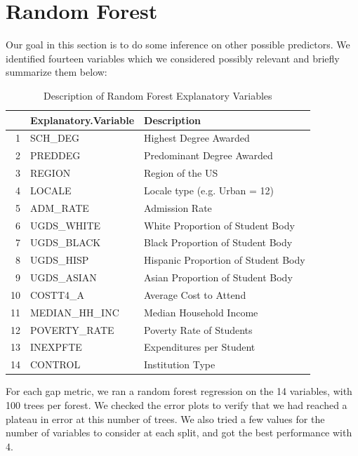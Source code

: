 \documentclass{article}
\begin{document}


\section{Random Forest}

Our goal in this section is to do some inference on other possible predictors. We identified fourteen variables which we considered possibly relevant and briefly summarize them below:
  
  
\begin{table}[ht]
\centering
\caption{Description of Random Forest Explanatory Variables} 
\begin{tabular}{rll}
  \hline
 & Explanatory.Variable & Description \\ 
  \hline
1 & SCH\_DEG & Highest Degree Awarded \\ 
  2 & PREDDEG & Predominant Degree Awarded \\ 
  3 & REGION & Region of the US \\ 
  4 & LOCALE & Locale type (e.g. Urban = 12) \\ 
  5 & ADM\_RATE & Admission Rate \\ 
  6 & UGDS\_WHITE & White Proportion of Student Body \\ 
  7 & UGDS\_BLACK & Black Proportion of Student Body \\ 
  8 & UGDS\_HISP & Hispanic Proportion of Student Body \\ 
  9 & UGDS\_ASIAN & Asian Proportion of Student Body \\ 
  10 & COSTT4\_A & Average Cost to Attend \\ 
  11 & MEDIAN\_HH\_INC & Median Household Income \\ 
  12 & POVERTY\_RATE & Poverty Rate of Students \\ 
  13 & INEXPFTE & Expenditures per Student \\ 
  14 & CONTROL & Institution Type \\ 
   \hline
\end{tabular}
\end{table}
For each gap metric, we ran a random forest regression on the 14 variables, with 100 trees per forest. We checked the error plots to verify that we had reached a plateau in error at this number of trees. We also tried a few values for the number of variables to consider at each split, and got the best performance with 4.
\end{document}
